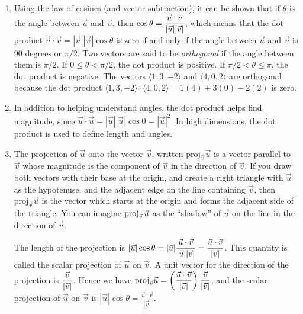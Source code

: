 \begin{enumerate}
\item Using the law of cosines (and vector subtraction), it can be
  shown that if $\theta$ is the angle between $\vec u$ and $\vec v$, then
  $\displaystyle \cos\theta = \frac{\vec u \cdot \vec v }{|\vec u||\vec v|}$, which means
  that the dot product $\vec u\cdot \vec v = |\vec u||\vec v|\cos\theta$ is
  zero if and only if the angle between $\vec u$ and $\vec v$ is 90
  degrees or $\pi/2$. Two vectors are said to be \emph{orthogonal} if
  the angle between them is $\pi/2$. If $0\leq\theta<\pi/2$, the dot product is
  positive. If $\pi/2<\theta\leq\pi$, the dot product is negative.  The vectors
  $\langle1,3,-2\rangle$ and $\langle4,0,2\rangle$ are orthogonal because the dot product
  $\langle1,3,-2\rangle\cdot \langle4,0,2\rangle=1(4)+3(0)-2(2)$ is zero.

\item In addition to helping understand angles, the dot product helps
  find magnitude, since $\vec u\cdot \vec u = |\vec u| |\vec u| \cos 0 =
  |\vec u|^2$. In high dimensions, the dot product is used to define
  length and angles.

\item The projection of $\vec u$ onto the vector $\vec v$, written
  $\text{proj}_{\vec{v}}\vec{u}$ is a vector parallel to $\vec v$
  whose magnitude is the component of $\vec u$ in the direction of
  $\vec v$.  If you draw both vectors with their base at the origin,
  and create a right triangle with $\vec u$ as the hypotenuse, and the
  adjacent edge on the line containing $\vec v$, then
  $\text{proj}_{\vec{v}}\vec{u}$ is the vector which starts at the
  origin and forms the adjacent side of the triangle.  You can imagine
  $\operatorname{proj}_{\vec v}\vec u$ as the ``shadow'' of $\vec u$ on the line in
  the direction of $\vec v$.

\begin{center}
\end{center}
	
The length of the projection is $\displaystyle|\vec u| \cos \theta = |\vec
u|\frac{\vec u\cdot \vec v}{|\vec u||\vec v|} = \frac{\vec u\cdot \vec
  v}{|\vec v|}$. This quantity is called the scalar projection of
$\vec u$ on $\vec v$. A unit vector for the direction of the
projection is $\displaystyle\frac{\vec v}{|\vec v|}$.  Hence we have
$\displaystyle\text{proj}_{\vec v}\vec u = \left(\frac{\vec u\cdot \vec v}{|\vec
    v|}\right)\frac{\vec v}{|\vec v|}$, and the scalar projection of
$\vec u$ on $\vec v$ is {$\displaystyle |\vec{u}| \cos\theta =
  \frac{\vec{u}\cdot \vec{v}}{|\vec{v}|}$}.


\end{enumerate}

